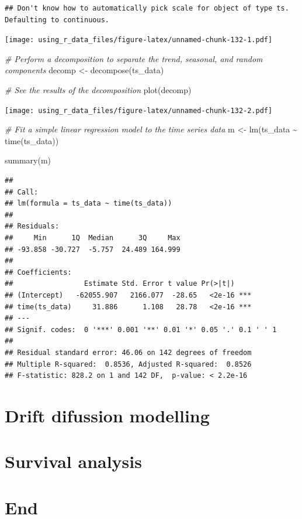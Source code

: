 \documentclass[
]{book}
\newenvironment{Shaded}{\begin{snugshade}}{\end{snugshade}}
\newcommand{\CommentTok}[1]{\textcolor[rgb]{0.56,0.35,0.01}{\textit{#1}}}
\newcommand{\FunctionTok}[1]{\textcolor[rgb]{0.00,0.00,0.00}{#1}}
\newcommand{\NormalTok}[1]{#1}
\newcommand{\OtherTok}[1]{\textcolor[rgb]{0.56,0.35,0.01}{#1}}
\newcommand{\SpecialCharTok}[1]{\textcolor[rgb]{0.00,0.00,0.00}{#1}}
\begin{document}
\begin{verbatim}
## Don't know how to automatically pick scale for object of type ts. Defaulting to continuous.
\end{verbatim}

\texttt{[image: using\_r\_data\_files/figure-latex/unnamed-chunk-132-1.pdf]}

\begin{Shaded}
\begin{Highlighting}[]
\CommentTok{\# Perform a decomposition to separate the trend, seasonal, and random components}
\NormalTok{decomp }\OtherTok{\textless{}{-}} \FunctionTok{decompose}\NormalTok{(ts\_data)}

\CommentTok{\# See the results of the decomposition}
\FunctionTok{plot}\NormalTok{(decomp)}
\end{Highlighting}
\end{Shaded}

\texttt{[image: using\_r\_data\_files/figure-latex/unnamed-chunk-132-2.pdf]}

\begin{Shaded}
\begin{Highlighting}[]
\CommentTok{\# Fit a simple linear regression model to the time series data}
\NormalTok{m }\OtherTok{\textless{}{-}} \FunctionTok{lm}\NormalTok{(ts\_data }\SpecialCharTok{\textasciitilde{}} \FunctionTok{time}\NormalTok{(ts\_data))}

\FunctionTok{summary}\NormalTok{(m)}
\end{Highlighting}
\end{Shaded}

\begin{verbatim}
## 
## Call:
## lm(formula = ts_data ~ time(ts_data))
## 
## Residuals:
##     Min      1Q  Median      3Q     Max 
## -93.858 -30.727  -5.757  24.489 164.999 
## 
## Coefficients:
##                 Estimate Std. Error t value Pr(>|t|)    
## (Intercept)   -62055.907   2166.077  -28.65   <2e-16 ***
## time(ts_data)     31.886      1.108   28.78   <2e-16 ***
## ---
## Signif. codes:  0 '***' 0.001 '**' 0.01 '*' 0.05 '.' 0.1 ' ' 1
## 
## Residual standard error: 46.06 on 142 degrees of freedom
## Multiple R-squared:  0.8536, Adjusted R-squared:  0.8526 
## F-statistic: 828.2 on 1 and 142 DF,  p-value: < 2.2e-16
\end{verbatim}

\hypertarget{drift-difussion-modelling}{%
\section{Drift difussion modelling}\label{drift-difussion-modelling}}

\hypertarget{survival-analysis}{%
\section{Survival analysis}\label{survival-analysis}}

\hypertarget{end-2}{%
\section{End}\label{end-2}}

  
\end{document}
